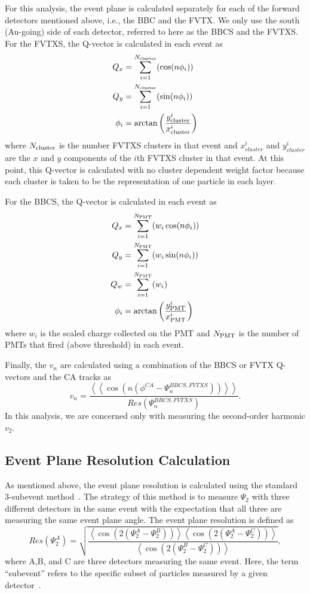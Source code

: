 For this analysis, the event plane is calculated separately for each of the forward detectors mentioned above, i.e., the BBC and the FVTX. We only use the south (Au-going) side of each detector, referred to here as the BBCS and the FVTXS.
For the FVTXS, the Q-vector is calculated in each event as
\begin{align}
Q_x &= \sum^{N_{\rm cluster}}_{i=1}( \cos(n\phi_i)) \\
Q_y &= \sum^{N_{\rm cluster}}_{i=1}( \sin(n\phi_i)) \\
\phi_i &= \arctan\left(\frac{y^i_{\rm cluster}}{x^i_{\rm cluster}}\right)
\end{align}
where $N_{\rm cluster}$ is the number FVTXS clusters in that event and $x^i_{cluster}$ and $y^i_{cluster}$are the $x$ and $y$ components of the $i$th FVTXS cluster in that event. At this point, this Q-vector is calculated with no cluster dependent weight factor because each cluster is taken to be the representation of one particle in each layer.

For the BBCS, the Q-vector is calculated in each event as
\begin{align}
Q_x &= \sum^{N_{\rm PMT}}_{i=1}( w_i \cos(n\phi_i)) \\
Q_y &= \sum^{N_{\rm PMT}}_{i=1}( w_i \sin(n\phi_i)) \\
Q_w &= \sum^{N_{\rm PMT}}_{i=1}( w_i ) \\
\phi_i &= \arctan\left(\frac{y^i_{\rm PMT}}{x^i_{\rm PMT}}\right) 
\label{eqn:bbc_ep_eqns}
\end{align}
where $w_i$ is the scaled charge collected on the PMT and $N_{\rm PMT}$ is the number of PMTs that fired (above threshold) in each event.

Finally, the $v_n$ are calculated using a combination of the BBCS or FVTX Q-vectors and the CA tracks as
\begin{equation}
v_n = \frac{\left<\left<\cos(n(\phi^{CA} - \Psi^{BBCS,FVTXS}_n))\right>\right>}{Res(\Psi^{BBCS,FVTXS}_n)}.
\end{equation}
In this analysis, we are concerned only with measuring the second-order harmonic $v_2$.

\subsection{Event Plane Resolution Calculation}%
As mentioned above, the event plane resolution is calculated using the standard 3-subevent method~\cite{PhysRevC.58.1671}. The strategy of this method is to measure $\Psi_2$ with three different detectors in the same event with the expectation that all three are measuring the same event plane angle. The event plane resolution is defined as
\begin{equation}
Res(\Psi_2^A) = \sqrt{\frac{\left<\cos(2(\Psi_2^A - \Psi_2^B))\right>\left<\cos(2(\Psi_2^A - \Psi_2^C))\right>}{\left<\cos(2(\Psi_2^B - \Psi_2^C))\right>}},
\label{eqn:res}
\end{equation}
where A,B, and C are three detectors measuring the same event. Here, the term ``subevent'' refers to the specific subset of particles measured by a given detector~\cite{PhysRevC.58.1671}.

